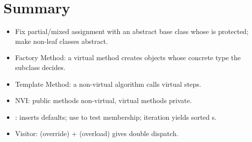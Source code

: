 \section*{Summary}
\begin{itemize}
  \item Fix partial/mixed assignment with an abstract base class whose
         is protected; make non-leaf classes abstract.
  \item Factory Method: a virtual method creates objects whose concrete type the
        subclass decides.
  \item Template Method: a non-virtual algorithm calls virtual steps.
  \item NVI: public methods non-virtual, virtual methods private.
  \item {}:  inserts defaults; use  to
        test membership; iteration yields sorted s.
  \item Visitor:  (override) +  (overload) gives
        double dispatch.
\end{itemize}
